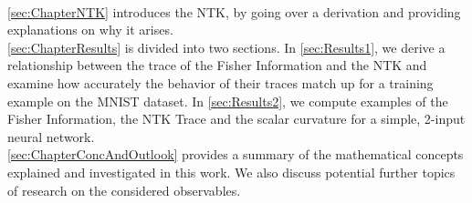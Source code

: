 \\
\cref{sec:ChapterNTK} introduces the NTK, by going over a derivation and providing explanations on why it arises.\\
\cref{sec:ChapterResults} is divided into two sections. In \cref{sec:Results1}, we derive a relationship between the trace of the Fisher Information and the NTK and examine how accurately the behavior of their traces match up for a training example on the MNIST dataset. In \cref{sec:Results2}, we compute examples of the Fisher Information, the NTK Trace and the scalar curvature for a simple, 2-input neural network.\\
\cref{sec:ChapterConcAndOutlook} provides a summary of the mathematical concepts explained and investigated in this work. We also discuss potential further topics of research on the considered observables.